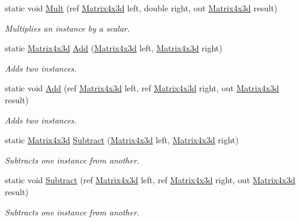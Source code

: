 \begin{DoxyCompactItemize}
static void \hyperlink{struct_open_t_k_1_1_matrix4x3d_a0aa91ea6858fe087c4658b51f9272200}{Mult} (ref \hyperlink{struct_open_t_k_1_1_matrix4x3d}{Matrix4x3d} left, double right, out \hyperlink{struct_open_t_k_1_1_matrix4x3d}{Matrix4x3d} result)
\begin{DoxyCompactList}\small\item\em Multiplies an instance by a scalar. \end{DoxyCompactList}\item 
static \hyperlink{struct_open_t_k_1_1_matrix4x3d}{Matrix4x3d} \hyperlink{struct_open_t_k_1_1_matrix4x3d_a2c500101e854eb04d59c2e49046b0908}{Add} (\hyperlink{struct_open_t_k_1_1_matrix4x3d}{Matrix4x3d} left, \hyperlink{struct_open_t_k_1_1_matrix4x3d}{Matrix4x3d} right)
\begin{DoxyCompactList}\small\item\em Adds two instances. \end{DoxyCompactList}\item 
static void \hyperlink{struct_open_t_k_1_1_matrix4x3d_af695641b41da07f3f4a640aa2b5c0ed7}{Add} (ref \hyperlink{struct_open_t_k_1_1_matrix4x3d}{Matrix4x3d} left, ref \hyperlink{struct_open_t_k_1_1_matrix4x3d}{Matrix4x3d} right, out \hyperlink{struct_open_t_k_1_1_matrix4x3d}{Matrix4x3d} result)
\begin{DoxyCompactList}\small\item\em Adds two instances. \end{DoxyCompactList}\item 
static \hyperlink{struct_open_t_k_1_1_matrix4x3d}{Matrix4x3d} \hyperlink{struct_open_t_k_1_1_matrix4x3d_aed0158acb037749faffecda5e027d547}{Subtract} (\hyperlink{struct_open_t_k_1_1_matrix4x3d}{Matrix4x3d} left, \hyperlink{struct_open_t_k_1_1_matrix4x3d}{Matrix4x3d} right)
\begin{DoxyCompactList}\small\item\em Subtracts one instance from another. \end{DoxyCompactList}\item 
static void \hyperlink{struct_open_t_k_1_1_matrix4x3d_a94113a045931d5270c4ec50e8dd17084}{Subtract} (ref \hyperlink{struct_open_t_k_1_1_matrix4x3d}{Matrix4x3d} left, ref \hyperlink{struct_open_t_k_1_1_matrix4x3d}{Matrix4x3d} right, out \hyperlink{struct_open_t_k_1_1_matrix4x3d}{Matrix4x3d} result)
\begin{DoxyCompactList}\small\item\em Subtracts one instance from another. \end{DoxyCompactList}\item 

\end{DoxyCompactItemize}

